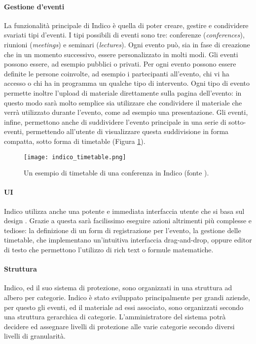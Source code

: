 		\paragraph{Gestione d'eventi}La funzionalità principale di Indico è quella di poter creare, gestire e condividere svariati tipi d'eventi. I tipi possibili di eventi sono tre: conferenze (\textit{conferences}), riunioni (\textit{meetings}) e seminari (\textit{lectures}). Ogni evento può, sia in fase di creazione che in un momento successivo, essere personalizzato in molti modi. Gli eventi possono essere, ad esempio pubblici o privati. Per ogni evento possono essere definite le persone coinvolte, ad esempio i partecipanti all'evento, chi vi ha accesso o chi ha in programma un qualche tipo di intervento. Ogni tipo di evento permette inoltre l'upload di materiale direttamente sulla pagina dell'evento: in questo modo sarà molto semplice sia utilizzare che condividere il materiale che verrà utilizzato durante l'evento, come ad esempio una presentazione. Gli eventi, infine, permettono anche di suddividere l'evento principale in una serie di sotto-eventi, permettendo all'utente di visualizzare questa suddivisione in forma compatta, sotto forma di timetable (Figura \ref{fig:indico_timetable}).
		
		\begin{figure}[h!]
			\begin{center}
				\texttt{[image: indico\_timetable.png]}
			\end{center}
			\caption[Timetable in Indico (esempio)]{Un esempio di timetable di una conferenza in Indico (fonte \cite{indico:user_guide_1.9.6}).}
			\label{fig:indico_timetable}
		\end{figure}
		
		\paragraph{UI}Indico utilizza anche una potente e immediata interfaccia utente che si basa sul design . Grazie a questa  sarà facilissimo eseguire azioni altrimenti più complesse e tediose: la definizione di un form di registrazione per l'evento, la gestione delle timetable, che implementano un'intuitiva interfaccia drag-and-drop, oppure editor di testo che permettono l'utilizzo di rich text o formule matematiche.
		
		\paragraph{Struttura}Indico, ed il suo sistema di protezione, sono organizzati in una struttura ad albero per categorie. Indico è stato sviluppato principalmente per grandi aziende, per questo gli eventi, ed il materiale ad essi associato, sono organizzati secondo una struttura gerarchica di categorie. L'amministratore del sistema potrà decidere ed assegnare livelli di protezione alle varie categorie secondo diversi livelli di granularità.

